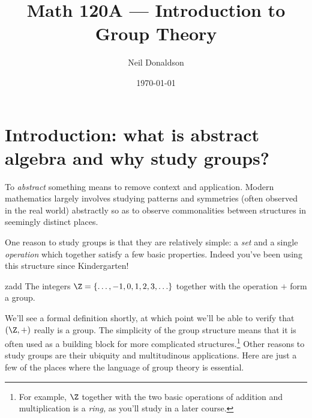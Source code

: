 \graphicspath{{1intro/asy/}}
\thispagestyle{empty}

\title{Math 120A --- Introduction to Group Theory}
\author{Neil Donaldson}
\date{\today}
\maketitle 


\section{Introduction: what is abstract algebra and why study groups?}\label{chap:intro}

To \emph{abstract} something means to remove context and application. Modern mathematics largely involves studying patterns and symmetries (often observed in the real world) abstractly so as to observe commonalities between structures in seemingly distinct places.\smallbreak

One reason to study groups is that they are relatively simple: a \emph{set} and a single \emph{operation} which together satisfy a few basic properties. Indeed you've been using this structure since Kindergarten!

\begin{example}{}{zadd}
	The integers $\Z=\{\ldots,-1,0,1,2,3,\ldots\}$ together with the operation $+$ form a group.
\end{example}

We'll see a formal definition shortly, at which point we'll be able to verify that $(\Z,+)$ really is a group. The simplicity of the group structure means that it is often used as a building block for more complicated structures.\footnote{For example, $\Z$ together with the two basic operations of addition and multiplication is a \emph{ring,} as you'll study in a later course.} Other reasons to study groups are their ubiquity and multitudinous applications. Here are just a few of the places where the language of group theory is essential.

